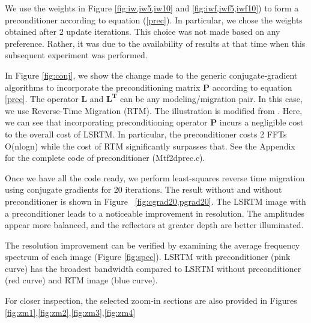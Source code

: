 We use the weights in Figure \ref{fig:iw,iw5,iw10} and \ref{fig:iwf,iwf5,iwf10}) to form a preconditioner according to equation (\ref{prec}). In particular, we chose the weights obtained after 2 update iterations. This choice was not made based on any preference. Rather, it was due to the availability of results at that time when this subsequent experiment was performed.

In Figure \ref{fig:conj}, we show the change made to the generic conjugate-gradient algorithms to incorporate the preconditioning matrix $\mathbf{P}$ according to equation \ref{prec}. The operator $\mathbf{L}$ and $\mathbf{L^T}$ can be any modeling/migration pair. In this case, we use Reverse-Time Migration (RTM). The illustration is modified from \cite[]{madagascar}. Here, we can see that incorporating preconditioning operator $\mathbf{P}$ incurs a negligible cost to the overall cost of LSRTM. In particular, the preconditioner costs 2 FFTs O(nlogn) while the cost of RTM significantly surpasses that. See the Appendix for the complete code of preconditioner (Mtf2dprec.c).


Once we have all the code ready, we perform least-squares reverse time migration using conjugate gradients for 20 iterations. The result without and without preconditioner is shown in Figure ~\ref{fig:cgrad20,pgrad20}. The LSRTM image with a preconditioner leads to a noticeable improvement in resolution. The amplitudes appear more balanced, and the reflectors at greater depth are better illuminated. 


%

The resolution improvement can be verified by examining the average frequency spectrum of each image (Figure \ref{fig:spec}). LSRTM with preconditioner (pink curve) has the broadest bandwidth compared to LSRTM without preconditioner (red curve) and RTM image (blue curve). 



%

For closer inspection, the selected zoom-in sections are also provided in Figures \ref{fig:zm1},\ref{fig:zm2},\ref{fig:zm3},\ref{fig:zm4}

